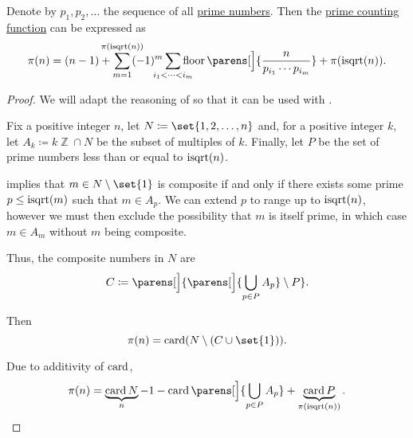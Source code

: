 \begin{proposition}\label{thm:inclusion_exclusion_eratosthenes}
  Denote by \( p_1, p_2, \ldots \) the sequence of all \hyperref[def:prime_number]{prime numbers}. Then the \hyperref[def:prime_counting_function]{prime counting function} can be expressed as
  \begin{equation}\label{eq:thm:inclusion_exclusion_eratosthenes}
    \pi(n) = (n - 1) + \sum_{m=1}^{\mathclap{\pi(\op{isqrt}(n))}} (-1)^m \sum_{\mathclap{i_1 < \cdots < i_m}} \floor\parens[\Big]{ \frac n {p_{i_1} \cdots p_{i_m}} } + \pi(\op{isqrt}(n)).
  \end{equation}
\end{proposition}
\begin{proof}
  We will adapt the reasoning of  so that it can be used with .

  Fix a positive integer \( n \), let \( N \coloneqq \set{ 1, 2, \ldots, n } \) and, for a positive integer \( k \), let \( A_k \coloneqq k\BbbZ \cap N \) be the subset of multiples of \( k \). Finally, let \( P \) be the set of prime numbers less than or equal to \( \op{isqrt}(n) \).

   implies that \( m \in N \setminus \set{ 1 } \) is composite if and only if there exists some prime \( p \leq \op{isqrt}(m) \) such that \( m \in A_p \). We can extend \( p \) to range up to \( \op{isqrt}(n) \), however we must then exclude the possibility that \( m \) is itself prime, in which case \( m \in A_m \) without \( m \) being composite.

  Thus, the composite numbers in \( N \) are
  \begin{equation*}
    C \coloneqq \parens[\Big]{ \parens[\Big]{ \bigcup_{p \in P} A_p } \setminus P }.
  \end{equation*}

  Then
  \begin{equation*}
    \pi(n) = \card(N \setminus (C \cup \set{ 1 })).
  \end{equation*}

  Due to additivity of \( \operatorname{card} \),
  \begin{equation}\label{eq:thm:inclusion_exclusion_eratosthenes/sets}
    \pi(n) = \underbrace{\card N}_n - 1 - \card\parens[\Big]{ \bigcup_{p \in P} A_p } + \underbrace{\card P}_{\pi(\op{isqrt}(n))}.
  \end{equation}


\end{proof}
